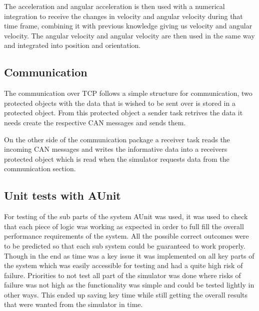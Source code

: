 The acceleration and angular acceleration is then used with a numerical integration to receive the changes in velocity and angular velocity during that time frame, combining it with previous knowledge giving us velocity and angular velocity. The angular velocity and angular velocity are then used in the same way and integrated into position and orientation. 

\subsection{Communication}

The communication over TCP follows a simple structure for communication, two protected objects with the data that is wished to be sent over is stored in a protected object. From this protected object a sender task retrives the data it needs create the respective CAN messages and sends them.

On the other side of the communication package a receiver task reads the incoming CAN messages and writes the informative data into a receivers protected object which is read when the simulator requests data from the communication section.

\subsection{Unit tests with AUnit}

For testing of the sub parts of the system AUnit was used, it was used to check that each piece of logic was working as expected in order to full fill the overall performance requirements of the system.  All the possible correct outcomes were to be predicted so that each sub system could be guaranteed to work properly. Though in the end as time was a key issue it was implemented on all key parts of the system which was easily accessible for testing and had a quite high risk of failure. Priorities to not test all part of the simulator was done where risks of failure was not high as the functionality was simple and could be tested lightly in other ways. This ended up saving key time while still getting the overall results that were wanted from the simulator in time.

